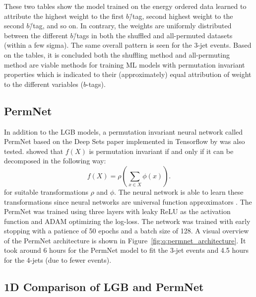 These two tables show the model trained on the energy ordered data learned to attribute the highest weight to the first $b$\=/tag, second highest weight to the second $b$\=/tag, and so on. In contrary, the weights are uniformly distributed between the different $b$\=/tags in both the shuffled and all-permuted datasets (within a few sigma). The same overall pattern is seen for the 3-jet events. Based on the tables, it is concluded both the shuffling method and all-permuting method are viable methods for training ML models with permutation invariant properties which is indicated to their (approximately) equal attribution of weight to the different variables ($b$-tags). 


\subsection{PermNet}
\label{subsec:q:permnet}

In addition to the LGB models, a permutation invariant neural network called PermNet based on the Deep Sets paper \autocite{zaheerDeepSets2017} implemented in Tensorflow \citep{tensorflow2015-whitepaper} by \citet{fayeFrederikFayeDeepcalo} was also tested. \citet{zaheerDeepSets2017} showed that $f(X)$ is permutation invariant if and only if it can be decomposed in the following way:
\begin{equation}
  \label{eq:q:deep_sets}
  f(X)=\rho\left(\sum_{x\in X} \phi(x) \right).
\end{equation}
for suitable transformations $\rho$ and $\phi$. The neural network is able to learn these transformations since neural networks are universal function approximators \autocite{hornikApproximationCapabilitiesMultilayer1991}. The PermNet was trained using three layers with leaky ReLU \autocite{Maas2013RectifierNI} as the activation function and ADAM \autocite{kingmaAdamMethodStochastic2014} optimizing the log-loss. The network was trained with early stopping with a patience of \num{50} epochs and a batch size of \num{128}. A visual overview of the PermNet architecture is shown in Figure~\ref{fig:q:permnet_architecture}. It took around \num{6} hours for the PermNet model to fit the 3-jet events and \num{4.5} hours for the 4-jets (due to fewer events).

\subsection{1D Comparison of LGB and PermNet}
\label{subsec:q:lgb_permnet_comparison}

